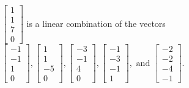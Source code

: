 \begin{exercise}
\begin{exerciseStatement}
  \end{exerciseStatement}
  \begin{exerciseAnswer}
   \(\left[\begin{array}{c}
1 \\
1 \\
7 \\
0
\end{array}\right]\) 
  	 is  
	a linear combination of the vectors \(\left[\begin{array}{c}
-1 \\
-1 \\
1 \\
0
\end{array}\right] , \left[\begin{array}{c}
1 \\
1 \\
-5 \\
0
\end{array}\right] , \left[\begin{array}{c}
-3 \\
-1 \\
4 \\
0
\end{array}\right] , \left[\begin{array}{c}
-1 \\
-3 \\
-1 \\
1
\end{array}\right] , \text{ and } \left[\begin{array}{c}
-2 \\
-2 \\
-4 \\
-1
\end{array}\right]\).

	
  


  \end{exerciseAnswer}
\end{exercise}